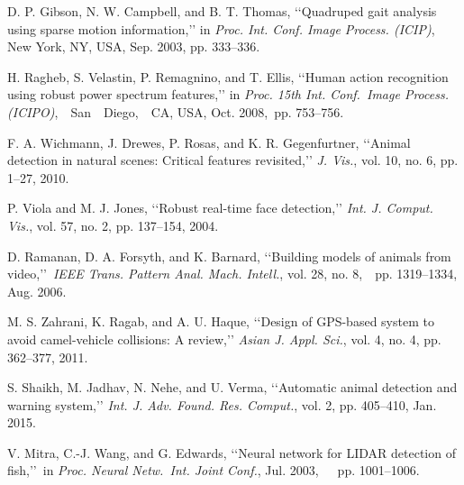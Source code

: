 \documentclass[14pt,a4paper,final]{extreport}
\begin{document}
\begin{thebibliography}{9}
{\fontsize{13pt}{8.4pt}\selectfont D. P. Gibson, N. W. Campbell, and B. T. Thomas, ‘‘Quadruped gait analysis using sparse motion information,’’ in \textit{Proc. Int. Conf. Image Process. (ICIP)}, New York, NY, USA, Sep. 2003, pp. 333–336.\par}\par

{\fontsize{13pt}{8.4pt}\selectfont H. Ragheb, S. Velastin, P. Remagnino, and T. Ellis, ‘‘Human action recognition using robust power spectrum features,’’ in \textit{Proc. 15th Int. Conf.\ Image Process.  (ICIPO)},\ \ San\ \ Diego,\ \ CA,  USA,  Oct.  2008,\  pp. 753–756.\par}\par

{\fontsize{13pt}{8.4pt}\selectfont F. A. Wichmann, J. Drewes, P. Rosas, and K. R. Gegenfurtner, ‘‘Animal detection in natural scenes: Critical features revisited,’’ \textit{J. Vis.}, vol. 10, no. 6, pp. 1–27, 2010.\par}\par

{\fontsize{13pt}{8.4pt}\selectfont P. Viola and M. J. Jones, ‘‘Robust real-time face detection,’’ \textit{Int. J. Comput. Vis.}, vol. 57, no. 2, pp. 137–154, 2004.\par}\par

{\fontsize{13pt}{8.4pt}\selectfont D. Ramanan, D. A. Forsyth, and K. Barnard, ‘‘Building models of animals from video,’’\  \textit{IEEE Trans. Pattern Anal. Mach. Intell.}, vol. 28, no. 8,\ \  pp. 1319–1334, Aug. 2006.\par}\par

{\fontsize{13pt}{8.4pt}\selectfont M. S. Zahrani, K. Ragab, and A. U. Haque, ‘‘Design of GPS-based system to avoid camel-vehicle collisions: A review,’’ \textit{Asian J. Appl. Sci.}, vol. 4, no. 4, pp. 362–377, 2011.\par}\par

{\fontsize{13pt}{8.4pt}\selectfont S. Shaikh, M. Jadhav, N. Nehe, and U. Verma, ‘‘Automatic animal detection and warning system,’’ \textit{Int. J. Adv. Found. Res. Comput.}, vol. 2, pp. 405–410, Jan. 2015.\par}\par

{\fontsize{13pt}{8.4pt}\selectfont V. Mitra, C.-J. Wang, and G. Edwards, ‘‘Neural network for LIDAR detection of fish,’’\  in \textit{Proc. Neural Netw.\  Int. Joint Conf.}, Jul. 2003,\ \ \  pp. 1001–1006.\par}\par


\end{thebibliography}
\end{document}
